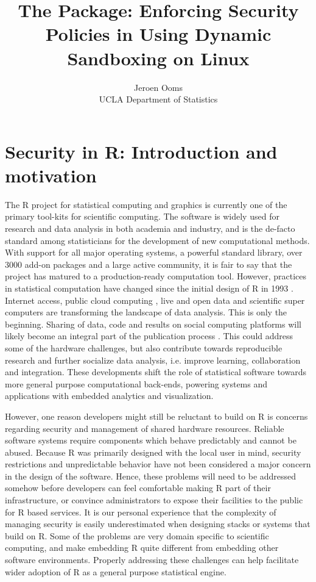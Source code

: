\documentclass{jss}
\author{Jeroen Ooms\\UCLA Department of Statistics}
\title{The \RAppArmor Package: Enforcing Security Policies in \R Using Dynamic
Sandboxing on Linux}
\newcommand{\R}{\textsf{R}\xspace}
\begin{document}
\section[Security in R: Introduction and motivation]{Security in \R:
Introduction and motivation}

The \R project for statistical computing and graphics \citep{R-project} is
currently one of the primary tool-kits for scientific computing. The software is
widely used for research and data analysis in both academia and industry, and is
the de-facto standard among statisticians for the development of new
computational methods. With support for all major operating systems, a powerful
standard library, over 3000 add-on packages and a large active community, it is
fair to say that the project has matured to a production-ready computation tool.
However, practices in statistical computation have changed since the initial
design of \R in 1993 \citep{ihaka1998r}. Internet access, public cloud computing
\citep{armbrust2010view}, live and open data and scientific super computers are
transforming the landscape of data analysis. This is only the beginning. Sharing
of data, code and results on social computing platforms will likely become an
integral part of the publication process \citep{asareport}. This could address
some of the hardware challenges, but also contribute towards reproducible
research and further socialize data analysis, i.e. improve learning,
collaboration and integration. These developments shift the role of
statistical software towards more general purpose computational back-ends,
powering systems and applications with embedded analytics and visualization.

However, one reason developers might still be reluctant to build on \R is
concerns regarding security and management of shared hardware resources.
Reliable software systems require components which behave predictably and
cannot be abused. Because \R was primarily designed with the local user in
mind, security restrictions and unpredictable behavior have not been considered
a major concern in the design of the software. Hence, these problems will need
to be addressed somehow before developers can feel comfortable making \R part
of their infrastructure, or convince administrators to expose their facilities
to the public for \R based services. It is our personal experience that the
complexity of managing security is easily underestimated when designing stacks
or systems that build on \R. Some of the problems are very domain specific to
scientific computing, and make embedding \R quite different from embedding
other software environments. Properly addressing these challenges can help
facilitate wider adoption of \R as a general purpose statistical engine.
\end{document}
